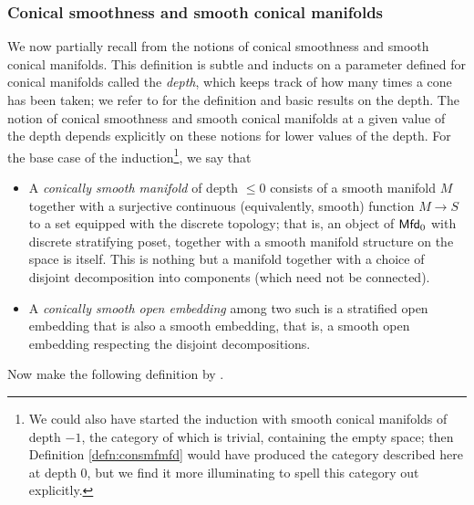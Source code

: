 \documentclass[10pt, reqno, twoside
, final
]{amsart}
\numberwithin{equation}{subsection}%
\theoremstyle{definition}
\theoremstyle{definition}
\theoremstyle{definition}
\theoremstyle{definition}
\theoremstyle{definition}
\theoremstyle{definition}
\theoremstyle{definition}
\theoremstyle{definition}
\theoremstyle{definition}
\theoremstyle{plain}
\theoremstyle{definition}
\theoremstyle{plain}
\theoremstyle{definition}
\theoremstyle{plain}
\theoremstyle{definition}
\theoremstyle{definition}
\theoremstyle{plain}
\theoremstyle{plain}
\theoremstyle{definition}
\theoremstyle{plain}
\theoremstyle{plain}
\theoremstyle{plain}
\begin{document}
\subsubsection{Conical smoothness and smooth conical manifolds}

We now partially recall from \cite{AFT-local-structures} the notions of conical smoothness and smooth conical manifolds. This definition is subtle and inducts on a parameter defined for conical manifolds called the \emph{depth}, which keeps track of how many times a cone has been taken; we refer to \cite[Section 2.4]{AFT-local-structures} for the definition and basic results on the depth. The notion of conical smoothness and smooth conical manifolds at a given value of the depth depends explicitly on these notions for lower values of the depth. For the base case of the induction\footnote{We could also have started the induction with smooth conical manifolds of depth $-1$, the category of which is trivial, containing the empty space; then Definition \ref{defn:consmfmfd} would have produced the category described here at depth $0$, but we find it more illuminating to spell this category out explicitly.}, we say that
\begin{itemize}
    \item A \emph{conically smooth manifold} of depth $\leq 0$ consists of a smooth manifold $M$ together with a surjective continuous (equivalently, smooth) function $M\rightarrow S$ to a set equipped with the discrete topology; that is, an object of $\mathsf{Mfd}_0$ with discrete stratifying poset, together with a smooth manifold structure on the space is itself. This is nothing but a manifold together with a choice of disjoint decomposition into components (which need not be connected).
    \item A \emph{conically smooth open embedding} among two such is a stratified open embedding that is also a smooth embedding, that is, a smooth open embedding respecting the disjoint decompositions. 
\end{itemize}
Now make the following definition by \cite{AFT-local-structures}.
\end{document}
